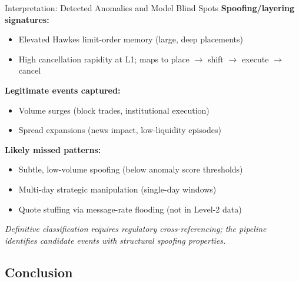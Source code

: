 \documentclass{beamer}
\newcommand{\takehome}[1]{%
  \vfill
  {\small\itshape #1}
}
\begin{document}
\begin{frame}{Interpretation: Detected Anomalies and Model Blind Spots}
    \textbf{Spoofing/layering signatures:}
    \begin{itemize}
        \item Elevated Hawkes limit-order memory (large, deep placements)
        \item High cancellation rapidity at L1; maps to place $\to$ shift $\to$ execute $\to$ cancel
    \end{itemize}
    \vspace{0.15cm}
    \textbf{Legitimate events captured:}
    \begin{itemize}
        \item Volume surges (block trades, institutional execution)
        \item Spread expansions (news impact, low-liquidity episodes)
    \end{itemize}
    \vspace{0.15cm}
    \textbf{Likely missed patterns:}
    \begin{itemize}
        \item Subtle, low-volume spoofing (below anomaly score thresholds)
        \item Multi-day strategic manipulation (single-day windows)
        \item Quote stuffing via message-rate flooding (not in Level-2 data)
    \end{itemize}
    \takehome{Definitive classification requires regulatory cross-referencing; the pipeline identifies candidate events with structural spoofing properties.}
\end{frame}


\subsection{Conclusion}
\end{document}
